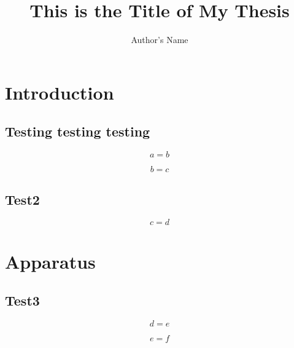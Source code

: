 \documentclass[12pt,english]{thesis}
\title{This is the Title of My Thesis}
\author{Author's Name}
\begin{document}
\maketitle

\frontmatter


\chapter{Introduction}


\section{Testing testing testing}

\begin{equation}
a=b\label{eq:}\end{equation}


\begin{equation}
b=c\label{eq:}\end{equation}



\section{Test2}


\begin{equation}
c=d\label{eq:}\end{equation}



\chapter{Apparatus}


\section{Test3}

\begin{equation}
d=e\label{eq:}\end{equation}


\begin{equation}
e=f\label{eq:}\end{equation}


\clearpage


 
\end{document}
